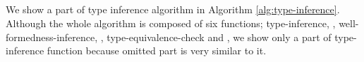 \begin{figure}
    \begin{center}
        \andalso
         \hfil
         \\[2mm]
         \\[2mm]
         \andalso
         \\[2mm]
         \\[2mm]
         \hfil
    \end{center}
    \label{fig:algorithmic-typing-rules}
\end{figure}


We show a part of type inference algorithm in Algorithm
\ref{alg:type-inference}. Although the whole algorithm is composed of six
functions; {\sc type-inference}, {}, {\sc
well-formedness-inference}, {}, {\sc
type-equivalence-check} and {}, we show only a part
of {\sc type-inference} function because omitted part is very similar to it.

